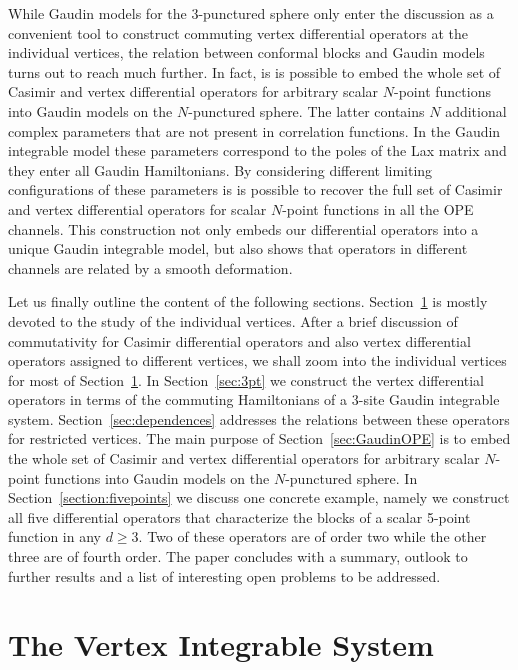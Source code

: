 \documentclass{article}
\begin{document}
While Gaudin models for the 3-punctured sphere only enter the discussion as 
a convenient tool to construct commuting vertex differential operators at the 
individual vertices, the relation between conformal blocks and Gaudin models 
turns out to reach much further. In fact, is is possible to embed the whole 
set of Casimir and vertex differential operators for arbitrary scalar $N$-point 
functions into Gaudin models on the $N$-punctured sphere. The latter contains 
$N$ additional complex parameters that are not present in correlation 
functions. In the Gaudin integrable model these parameters correspond to 
the poles of the Lax matrix and they enter all Gaudin Hamiltonians. By 
considering different limiting configurations of these parameters is is 
possible to recover the full set of Casimir and vertex differential 
operators for scalar $N$-point functions in all the OPE channels. This 
construction not only embeds our differential operators into a unique 
Gaudin integrable model, but also shows that operators in different channels 
are related by a smooth deformation.
\medskip 

Let us finally outline the content of the following sections. 
Section~\ref{sect:vertexsystem} is mostly devoted to the study of the 
individual vertices. After a brief discussion of commutativity for Casimir 
differential operators and also vertex differential operators assigned to 
different vertices, we shall zoom into the individual vertices for most of Section~\ref{sect:vertexsystem}. In Section~\ref{sec:3pt} 
we construct the vertex differential operators in terms of the commuting 
Hamiltonians of a 3-site Gaudin integrable system. Section~\ref{sec:dependences} 
addresses the relations between these operators for restricted vertices. 
The main purpose of Section~\ref{sec:GaudinOPE} is to embed the whole set of 
Casimir and vertex differential operators for arbitrary scalar $N$-point 
functions into Gaudin models on the $N$-punctured sphere. In 
Section~\ref{section:fivepoints} we discuss one concrete example, namely we 
construct all five differential operators that characterize the blocks of a scalar 
5-point function in any $d \geq 3$. Two of these operators are of 
order two while the other three are of fourth order. The paper 
concludes with a summary, outlook to further results  and a list 
of interesting open problems to be addressed. 


\section{The Vertex Integrable System}
\label{sect:vertexsystem}
\end{document}
